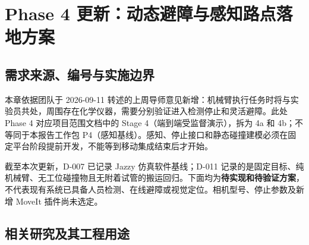\chapter[动态避障与感知路点方案]{Phase 4 更新：动态避障与感知路点落地方案}
\label{ch:dynamic-perception}

\section{需求来源、编号与实施边界}

本章依据团队于 2026-09-11 转述的上周导师意见新增：机械臂执行任务时将与实验员共处，周围存在化学仪器，需要分别验证进入检测停止和灵活避障。此处 Phase 4 对应项目范围文档中的 Stage 4（端到端受监督演示），拆为 4a 和 4b；不等同于本报告工作包 P4（感知基线）。感知、停止接口和静态碰撞建模必须在固定平台阶段提前开发，不能等到移动集成结束后才开始。

截至本次更新，D-007 已记录 Jazzy 仿真软件基线；D-011 记录的是固定目标、纯机械臂、无工位碰撞物且无附着试管的搬运回归。下面均为\textbf{待实现和待验证方案}，不代表现有系统已具备人员检测、在线避障或视觉定位。相机型号、停止参数及新增 MoveIt 插件尚未选定。

\section{相关研究及其工程用途}


